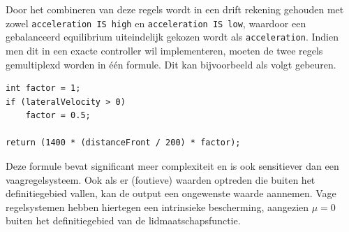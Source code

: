 \documentclass[10pt,a4paper]{article}
\begin{document}
			Door het combineren van deze regels wordt in een drift rekening gehouden met zowel \texttt{acceleration IS high} en \texttt{acceleration IS low}, waardoor een gebalanceerd equilibrium uiteindelijk gekozen wordt als \texttt{acceleration}.
			Indien men dit in een exacte controller wil implementeren, moeten de twee regels gemultiplexd worden in \'e\'en formule. Dit kan bijvoorbeeld als volgt gebeuren.

			\begin{lstlisting}
int factor = 1;
if (lateralVelocity > 0)
	factor = 0.5;

return (1400 * (distanceFront / 200) * factor);
			\end{lstlisting}

			Deze formule bevat significant meer complexiteit en is ook sensitiever dan een vaagregelsysteem. Ook als er (foutieve) waarden optreden die buiten het definitiegebied vallen, kan de output een ongewenste waarde aannemen. Vage regelsystemen hebben hiertegen een intrinsieke bescherming, aangezien $\mu = 0$ buiten het definitiegebied van de lidmaatschapsfunctie.
\end{document}
